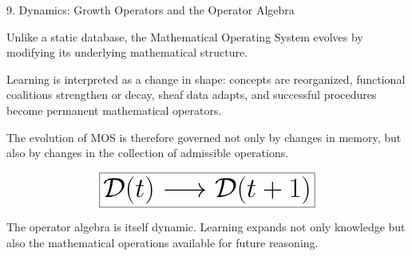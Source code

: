 %
%
%

\begin{mosbox}{9. Dynamics: Growth Operators and the Operator Algebra}

\BodyFont

Unlike a static database, the Mathematical Operating System evolves by
modifying its underlying mathematical structure.

Learning is interpreted as a change in shape: concepts are reorganized,
functional coalitions strengthen or decay, sheaf data adapts, and
successful procedures become permanent mathematical operators.

The evolution of MOS is therefore governed not only by changes in memory,
but also by changes in the collection of admissible operations.

\end{mosbox}


\begin{eqbox}

\[
\Huge
\boxed{
\mathcal D(t)
\longrightarrow
\mathcal D(t+1)
}
\]

\vspace{3mm}

\BodyFont

The operator algebra is itself dynamic.
Learning expands not only knowledge but also the mathematical operations
available for future reasoning.

\end{eqbox}


